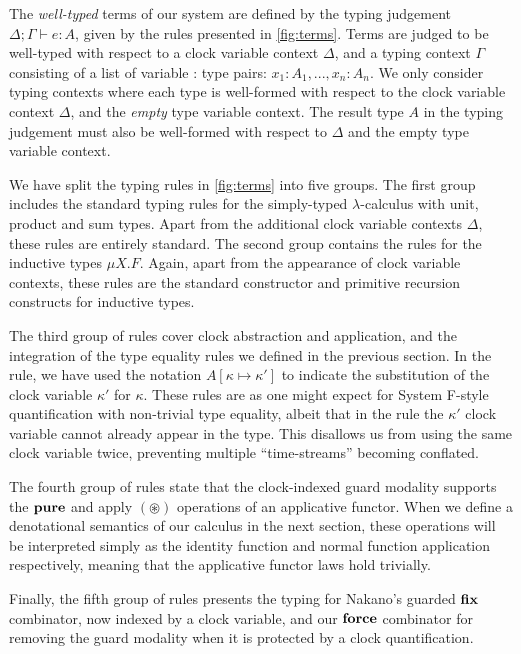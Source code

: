 The \emph{well-typed} terms of our system are defined by the typing judgement
$\Delta; \Gamma \vdash e : A$, given by the rules presented in
\autoref{fig:terms}. Terms are judged to be well-typed with respect to
a clock variable context $\Delta$, and a typing context $\Gamma$
consisting of a list of variable : type pairs: $x_1 : A_1, ..., x_n :
A_n$. We only consider typing contexts where each type is well-formed
with respect to the clock variable context $\Delta$, and the
\emph{empty} type variable context. The result type $A$ in the typing
judgement must also be well-formed with respect to $\Delta$ and the
empty type variable context.

We have split the typing rules in \autoref{fig:terms} into five
groups. The first group includes the standard typing rules for the
simply-typed $\lambda$-calculus with unit, product and sum
types. Apart from the additional clock variable contexts $\Delta$,
these rules are entirely standard. The second group contains the rules
for the inductive types $\mu X. F$. Again, apart from the appearance
of clock variable contexts, these rules are the standard constructor
and primitive recursion constructs for inductive types.

The third group of rules cover clock abstraction and application, and
the integration of the type equality rules we defined in the previous
section. In the  rule, we have used the notation
$A[\kappa \mapsto \kappa']$ to indicate the substitution of the clock
variable $\kappa'$ for $\kappa$. These rules are as one might expect
for System F-style quantification with non-trivial type equality,
albeit that in the  rule the $\kappa'$ clock
variable cannot already appear in the type. This disallows us from
using the same clock variable twice, preventing multiple
``time-streams'' becoming conflated.

The fourth group of rules state that the clock-indexed guard modality
supports the $\textbf{pure}$ and apply $(\mathord\circledast)$ operations
of an applicative functor. When we define a denotational semantics of
our calculus in the next section, these operations will be interpreted
simply as the identity function and normal function application
respectively, meaning that the applicative functor laws hold
trivially.

Finally, the fifth group of rules presents the typing for Nakano's
guarded $\textbf{fix}$ combinator, now indexed by a clock variable, and
our $\textbf{force}$ combinator for removing the guard modality when it is
protected by a clock quantification.

